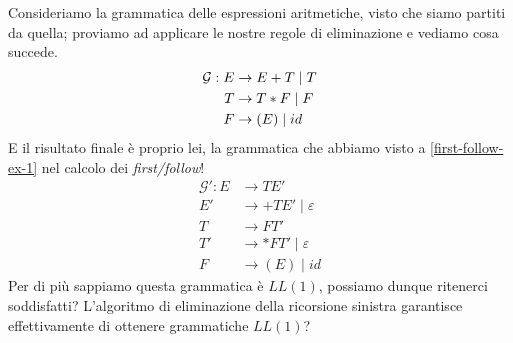 \documentclass[class=book, crop=false, oneside, 12pt]{standalone}
\begin{document}
Consideriamo la grammatica delle espressioni aritmetiche, visto che siamo partiti da quella; proviamo ad applicare le nostre regole di eliminazione e vediamo cosa succede.
\begin{align*}
    \mathcal{G}: E &\to E+T \mid T \\
    T &\to T*F \mid F \nonumber \\
    F &\to (E) \mid id \nonumber 
\end{align*}
E il risultato finale è proprio lei, la grammatica che abbiamo visto a \ref{first-follow-ex-1} nel calcolo dei \emph{first/follow}!%
\begin{align*}
    \mathcal{G'}: E &\rightarrow TE' \\
    E' &\rightarrow +TE' \mid \varepsilon \\
    T &\rightarrow FT' \\
    T' &\rightarrow *FT' \mid \varepsilon \\
    F &\rightarrow (E) \mid id
\end{align*}
Per di più sappiamo questa grammatica è \(LL(1)\), possiamo dunque ritenerci soddisfatti? L'algoritmo di eliminazione della ricorsione sinistra garantisce effettivamente di ottenere grammatiche \(LL(1)\)?
\end{document}
